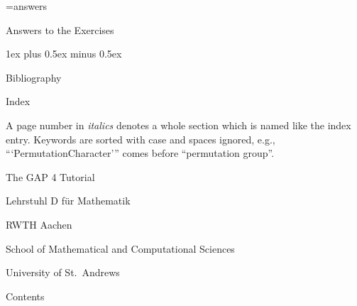 
\immediate\openout\ans=answers

\FrontMatter
%

\Chapters
{}

\Appendices

\Chapter Answers to the Exercises

\parskip 1ex plus 0.5ex minus 0.5ex
\immediate\closeout\ans


\Chapter Bibliography

\Bibliography

\Chapter Index

A page number in {\it italics} denotes a whole  section which is named
like   the index entry.  Keywords  are   sorted  with case and  spaces
ignored,  e.g., ```PermutationCharacter''' comes before  ``permutation
group''.

\Index

\undoquotes
\null\vfill
\centerline{\titlefont The GAP 4 Tutorial}
\bigskip
\centerline{\secfont Lehrstuhl D f\"ur Mathematik}
\smallskip
\centerline{\secfont RWTH Aachen}
\bigskip
\centerline{\secfont School of Mathematical and Computational
Sciences}
\smallskip
\centerline{\secfont University of St.~Andrews}

\Chapter Contents
  
\TableOfContents

\bye
